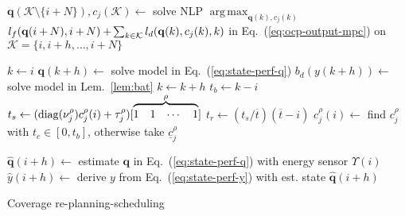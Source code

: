 \documentclass[letterpaper,10pt,journal,twoside]{IEEEtran}
\theoremstyle{definition}
\DeclareMathOperator*{\argmax}{arg\,max}
\begin{document}
\begin{algorithm}[t]
  \begin{algorithmic}[1]
    \small
      \makeatletter
      \setcounter{ALC@line}{15}
      \makeatother
      \STATE $\mathbf{q}(\mathcal{K}\setminus\{i+N\}),c_j(\mathcal{K})\gets${ \vspace*{.3ex}solve NLP }$\argmax_{\mathbf{q}(k),c_j(k)}$ \vspace*{.7ex}\hspace*{1em}${l_f(\mathbf{q}(i+\hspace*{-.1ex}N),i+\hspace*{-.1ex}N)}+\hspace*{-.2ex}{\sum_{k\in\mathcal{K}}{l_d(\mathbf{q}(k),c_j(k),k)}}${ in Eq.~(\ref{eq:ocp-output-mpc}) \hspace*{1em}on }$\mathcal{K}=\{i,i+h,\dots,i+N\}$\vspace*{.3ex}\label{alg:mpc}
      
      \vspace*{.8ex}
      \STATE $k\gets i$\vspace*{.3ex}\label{alg:bat1}
      \vspace*{.3ex}
          \STATE $\mathbf{q}(k+h)\gets${ solve model in Eq.~(\ref{eq:state-perf-q})}\vspace*{.3ex}\label{alg:evol}
        \ENDIF
        \STATE $b_d(y(k+h))\gets${ solve model in Lem.~\ref{lem:bat}}\vspace*{.3ex}
        \STATE $k\gets k+h$\vspace*{.3ex}
      \ENDWHILE
      \STATE $t_b\gets k-i$\vspace*{.3ex}\label{alg:bat2}
      \vspace*{-1.4ex}
      \STATE $t_s\gets(\mathrm{diag}(\nu_j^\rho)\vspace*{.3ex}c_j^\rho(i)+\tau_j^\rho)[\overbrace{\begin{matrix}1&1&\cdots&1\end{matrix}}^{\rho}]$\vspace*{.3ex}\label{alg:traj1}
      \STATE $t_r\gets(t_s/\overline{t})(\overline{t}-i)$\vspace*{.3ex}
        \STATE $c_j^{\rho}(i)\gets${ find }$c_j^{\rho}${ with }$t_c\in[0,t_b]${, otherwise take }$\underline{c}_j^\rho$\vspace*{.3ex}\label{alg:traj2}
      \ENDIF

      \vspace*{.8ex}
      \STATE $\hat{\mathbf{q}}(i+h)\gets${ estimate }$\mathbf{q}${ in Eq.~(\ref{eq:state-perf-q}) with energy sensor }$\Upsilon(i)$\vspace*{.3ex}\label{alg:klm1}
      \STATE $\hat{y}(i+h)\gets${ derive }$y${ from Eq.~(\ref{eq:state-perf-y}) with est. state }$\hat{\mathbf{q}}(i+h)$\vspace*{.3ex}\label{alg:klm2}
    \ENDFOR
  \end{algorithmic}
  \caption{Coverage re-planning-scheduling}\label{alg}
\end{algorithm}
\end{document}
